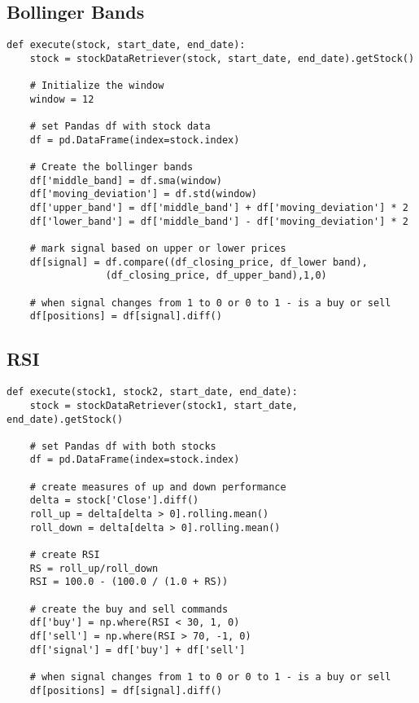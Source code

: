 \documentclass[../thesis.tex]{subfiles}
\begin{document}
\subsection{Bollinger Bands }

\begin{verbatim}
def execute(stock, start_date, end_date):
    stock = stockDataRetriever(stock, start_date, end_date).getStock()

    # Initialize the window
    window = 12

    # set Pandas df with stock data
    df = pd.DataFrame(index=stock.index)

    # Create the bollinger bands
    df['middle_band] = df.sma(window)
    df['moving_deviation'] = df.std(window)
    df['upper_band'] = df['middle_band'] + df['moving_deviation'] * 2
    df['lower_band'] = df['middle_band'] - df['moving_deviation'] * 2

    # mark signal based on upper or lower prices
    df[signal] = df.compare((df_closing_price, df_lower band), 
    		     (df_closing_price, df_upper_band),1,0)

    # when signal changes from 1 to 0 or 0 to 1 - is a buy or sell
    df[positions] = df[signal].diff()

\end{verbatim}

\subsection{RSI }

\begin{verbatim}
def execute(stock1, stock2, start_date, end_date):
    stock = stockDataRetriever(stock1, start_date, end_date).getStock()

    # set Pandas df with both stocks
    df = pd.DataFrame(index=stock.index)

    # create measures of up and down performance
    delta = stock['Close'].diff()
    roll_up = delta[delta > 0].rolling.mean()
    roll_down = delta[delta > 0].rolling.mean()
    
    # create RSI
    RS = roll_up/roll_down
    RSI = 100.0 - (100.0 / (1.0 + RS))

    # create the buy and sell commands
    df['buy'] = np.where(RSI < 30, 1, 0)
    df['sell'] = np.where(RSI > 70, -1, 0)
    df['signal'] = df['buy'] + df['sell']

    # when signal changes from 1 to 0 or 0 to 1 - is a buy or sell
    df[positions] = df[signal].diff()

\end{verbatim}
\end{document}
